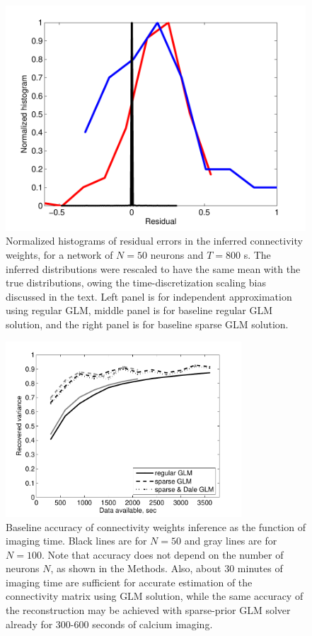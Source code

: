 \begin{figure}[h]
\begin{minipage}[c]{0.30\hsize}
\includegraphics[width=\hsize]{../figs/Figure10c_residuals_basespa}
\end{minipage}
\caption{Normalized histograms of residual errors in the inferred connectivity weights, for
a network of $N=50$ neurons and $T=800$ s. The inferred distributions were rescaled
to have the same mean with the true distributions, owing the time-discretization scaling bias
discussed in the text.
Left panel is for independent approximation using regular GLM, middle panel is
for baseline regular GLM solution, and the right panel is for baseline
sparse GLM solution.}
\label{fig:residuals}
\end{figure}

\begin{figure}[h]
	\centering
\includegraphics[width=250pt]{../figs/Figure4_perf_vs_T}
\caption{Baseline accuracy of connectivity weights inference as the function of imaging time. Black lines are for $N=50$ and gray lines are for $N=100$. Note that accuracy does not depend on the number of neurons $N$, as shown in the Methods. Also, about 30 minutes of imaging time are sufficient for accurate estimation of the connectivity matrix using GLM solution, while the same accuracy of the reconstruction may be achieved with sparse-prior GLM solver already for 300-600 seconds of calcium imaging.}
\label{fig:data-time}
\end{figure}


